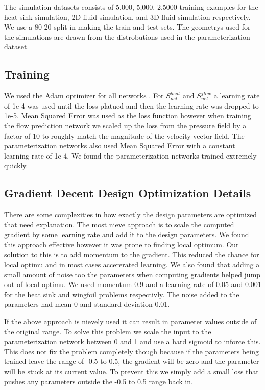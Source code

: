 \documentclass{article} %
\begin{document}
The simulation datasets consists of 5,000, 5,000, 2,5000 training examples for the heat sink simulation, 2D fluid simulation, and 3D fluid simulation respectively. We use a 80-20 split in making the train and test sets. The geometrys used for the simulations are drawn from the distrobutions used in the parameterization dataset.

\subsection{Training}

We used the Adam optimizer for all networks \cite{kingma2014adam}. For $S^{heat}_{net}$ and $S^{flow}_{net}$ a learning rate of 1e-4 was used until the loss platued and then the learning rate was dropped to 1e-5. Mean Squared Error was used as the loss function however when training the flow prediction network we scaled up the loss from the pressure field by a factor of 10 to roughly match the magnitude of the velocity vector field. The parameterization networks also used Mean Squared Error with a constant learning rate of 1e-4. We found the parameterization networks trained extremely quickly.

\subsection{Gradient Decent Design Optimization Details}

There are some complexities in how exactly the design parameters are optimized that need explanation. The most nieve approach is to scale the computed gradient by some learning rate and add it to the design parameters. We found this approach effective however it was prone to finding local optimum. Our solution to this is to add momentum to the gradient. This reduced the chance for local optimu and in most cases accererated learning. We also found that adding a small amount of noise too the parameters when computing gradients helped jump out of local optimu. We used momentum 0.9 and a learning rate of 0.05 and 0.001 for the heat sink and wingfoil problems respectivly. The noise added to the parameters had mean 0 and standard deviation 0.01.

If the above approach is nievely used it can result in parameter values outside of the original range. To solve this problem we scale the input to the parameterization network between 0 and 1 and use a hard sigmoid to inforce this. This does not fix the problem completely though because if the parameters being trained leave the range of -0.5 to 0.5, the gradient will be zero and the parameter will be stuck at its current value. To prevent this we simply add a small loss that pushes any parameters outside the -0.5 to 0.5 range back in.
\end{document}
